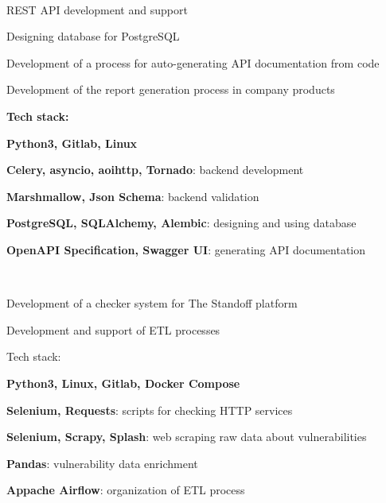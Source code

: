 \documentclass[a4paper]{MagicalCV}
\begin{document}
\hfill
\begin{minipage}[t]{0.66\textwidth} 


 \\
\vspace{\topsep} %
\begin{tightemize}
  \item REST API development and support
  \item Designing database for PostgreSQL
  \item Development of a process for auto-generating API documentation from code
  \item Development of the report generation process in company products
\end{tightemize}
\textbf{Tech stack:} 
\begin{tightemize}
  \item \textbf{Python3, Gitlab, Linux}
  \item \textbf{Celery, asyncio, aoihttp, Tornado}: backend development
  \item \textbf{Marshmallow, Json Schema}: backend validation
  \item \textbf{PostgreSQL, SQLAlchemy, Alembic}: designing and using database
  \item \textbf{OpenAPI Specification, Swagger UI}: generating API documentation
\end{tightemize}
\sectionsep

 \\
\vspace{\topsep} %
\begin{tightemize}
  \item Development of a checker system for The Standoff platform
  \item Development and support of ETL processes
\end{tightemize}
Tech stack:
\begin{tightemize}
  \item \textbf{Python3, Linux, Gitlab, Docker Compose}
  \item \textbf{Selenium, Requests}: scripts for checking HTTP services
  \item \textbf{Selenium, Scrapy, Splash}: web scraping raw data about vulnerabilities
  \item \textbf{Pandas}: vulnerability data enrichment
  \item \textbf{Appache Airflow}: organization of ETL process
\end{tightemize}
\sectionsep


\end{minipage} 
\end{document}
